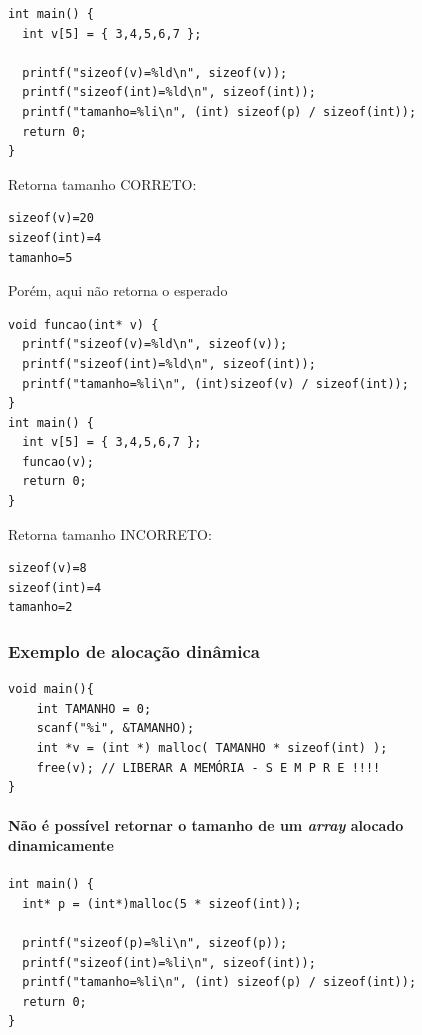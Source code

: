 \documentclass[12pt,a4paper]{article}
\begin{document}
\begin{verbatim}
int main() {
  int v[5] = { 3,4,5,6,7 };

  printf("sizeof(v)=%ld\n", sizeof(v));
  printf("sizeof(int)=%ld\n", sizeof(int));
  printf("tamanho=%li\n", (int) sizeof(p) / sizeof(int));
  return 0;
}
\end{verbatim}

Retorna tamanho CORRETO:

\begin{verbatim}
sizeof(v)=20
sizeof(int)=4
tamanho=5
\end{verbatim}

Porém, aqui não retorna o esperado

\begin{verbatim}
void funcao(int* v) {
  printf("sizeof(v)=%ld\n", sizeof(v));
  printf("sizeof(int)=%ld\n", sizeof(int));
  printf("tamanho=%li\n", (int)sizeof(v) / sizeof(int));
}
int main() {
  int v[5] = { 3,4,5,6,7 };
  funcao(v);
  return 0;
}
\end{verbatim}

Retorna tamanho INCORRETO:

\begin{verbatim}
sizeof(v)=8
sizeof(int)=4
tamanho=2
\end{verbatim}

    \hypertarget{exemplo-de-alocauxe7uxe3o-dinuxe2mica}{%
\subsubsection{Exemplo de alocação
dinâmica}\label{exemplo-de-alocauxe7uxe3o-dinuxe2mica}}

\begin{verbatim}
void main(){
    int TAMANHO = 0;
    scanf("%i", &TAMANHO);
    int *v = (int *) malloc( TAMANHO * sizeof(int) );
    free(v); // LIBERAR A MEMÓRIA - S E M P R E !!!!
}
\end{verbatim}

\hypertarget{nuxe3o-uxe9-possuxedvel-retornar-o-tamanho-de-um-array-alocado-dinamicamente}{%
\paragraph{\texorpdfstring{Não é possível retornar o tamanho de um
\emph{array} alocado
dinamicamente}{Não é possível retornar o tamanho de um array alocado dinamicamente}}\label{nuxe3o-uxe9-possuxedvel-retornar-o-tamanho-de-um-array-alocado-dinamicamente}}

\begin{verbatim}
int main() {
  int* p = (int*)malloc(5 * sizeof(int));

  printf("sizeof(p)=%li\n", sizeof(p));
  printf("sizeof(int)=%li\n", sizeof(int));
  printf("tamanho=%li\n", (int) sizeof(p) / sizeof(int));
  return 0;
}
\end{verbatim}
\end{document}
